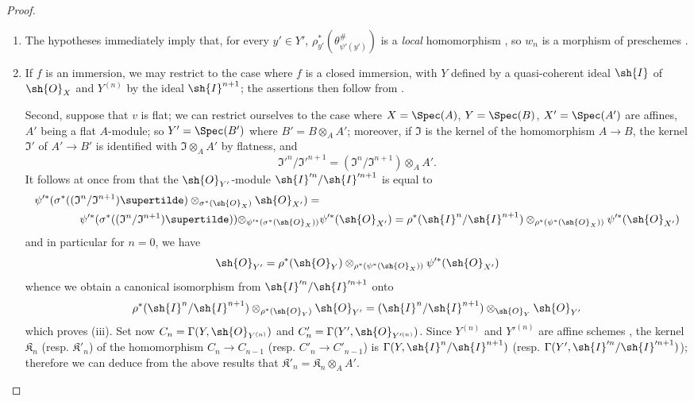 \begin{proof}
\medskip\noindent
\begin{enumerate}
  \item[(i)] The hypotheses immediately imply that, for every $y' \in Y'$, $\rho_{y'}^*(\theta_{\psi'(y')}^\#)$ is a \emph{local} homomorphism , so $w_n$ is a morphism of preschemes .
  \item[(ii) and (iii)] If $f$ is an immersion, we may restrict to the case where $f$ is a closed immersion, with $Y$ defined by a quasi-coherent ideal $\sh{I}$ of $\sh{O}_X$ and $Y^{(n)}$ by the ideal $\sh{I}^{n+1}$;
  the assertions then follow from .

  Second, suppose that $v$ is flat;
  we can restrict ourselves to the case where $X = \Spec(A)$, $Y = \Spec(B)$, $X' = \Spec(A')$ are affines, $A'$ being a flat $A$-module;
  so $Y' = \Spec(B')$ where $B' = B \otimes_A A'$;
  moreover, if $\mathfrak{I}$ is the kernel of the homomorphism $A\to B$, the kernel $\mathfrak{I}'$ of $A'\to B'$ is identified with $\mathfrak{I}\otimes_A A'$ by flatness, and
  \[
    \mathfrak{I}'^n/\mathfrak{I}'^{n+1}=(\mathfrak{I}^n/\mathfrak{I}^{n+1})\otimes_A A'.
  \]
  It follows at once from  that the $\sh{O}_{Y'}$-module $\sh{I}'^n/\sh{I}'^{n+1}$ is equal to
  \begin{align*}
    \psi'^*(\sigma^*((\mathfrak{I}^n/\mathfrak{I}^{n+1})\supertilde) \otimes_{\sigma^*(\sh{O}_X)} \sh{O}_{X'}) =& \\
    \psi'^*(\sigma^*((\mathfrak{I}^n/\mathfrak{I}^{n+1})\supertilde)) \otimes_{\psi'^*(\sigma^*(\sh{O}_X))} &\psi'^*(\sh{O}_{X'}) = \rho^*(\sh{I}^n/\sh{I}^{n+1})\otimes_{\rho^*(\psi^*(\sh{O}_X))} \psi'^*(\sh{O}_{X'})
  \end{align*}
  and in particular for $n = 0$, we have
  \[
    \sh{O}_{Y'} = \rho^*(\sh{O}_Y) \otimes_{\rho^*(\psi^*(\sh{O}_X))} \psi'^*(\sh{O}_{X'})
  \]
  whence we obtain a canonical isomorphism from $\sh{I}'^n/\sh{I}'^{n+1}$ onto
  \[
    \rho^*(\sh{I}^n/\sh{I}^{n+1})\otimes_{\rho^*(\sh{O}_Y)} \sh{O}_{Y'} = (\sh{I}^n/\sh{I}^{n+1}) \otimes_{\sh{O}_Y} \sh{O}_{Y'}
  \]
  which proves (iii).
  Set now $C_n=\Gamma(Y,\sh{O}_{Y^{(n)}})$ and $C'_n=\Gamma(Y',\sh{O}_{Y'^{(n)}})$.
  Since $Y^{(n)}$ and $Y'^{(n)}$ are affine schemes , the kernel $\mathfrak{K}_n$ (resp. $\mathfrak{K}'_n$) of the homomorphism $C_n\to C_{n-1}$ (resp. $C'_n\to C'_{n-1}$) is $\Gamma(Y,\sh{I}^n/\sh{I}^{n+1})$ (resp. $\Gamma(Y',\sh{I}'^n/\sh{I}'^{n+1})$);
  therefore we can deduce from the above results that $\mathfrak{K}'_n = \mathfrak{K}_n \otimes_A A'$.

\end{enumerate}
\end{proof}
